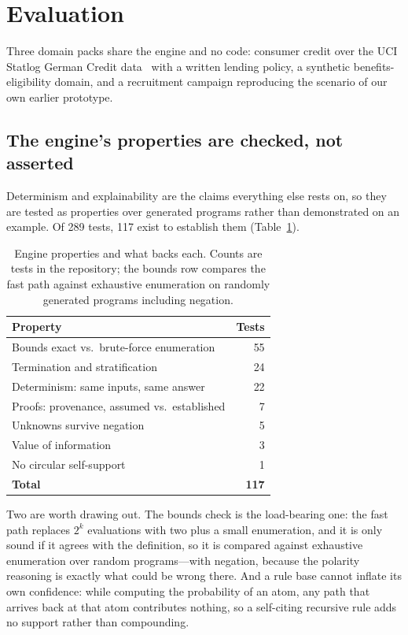 \documentclass[sigconf,nonacm]{acmart}
\begin{document}
\section{Evaluation}

Three domain packs share the engine and no code: consumer credit over the UCI
Statlog German Credit data~\cite{hofmann1994} with a written lending policy, a
synthetic benefits-eligibility domain, and a recruitment campaign reproducing
the scenario of our own earlier prototype.

\subsection{The engine's properties are checked, not asserted}

Determinism and explainability are the claims everything else rests on, so they
are tested as properties over generated programs rather than demonstrated on an
example. Of 289 tests, 117 exist to establish them (Table~\ref{tab:engine}).

\begin{table}[t]
  \caption{Engine properties and what backs each. Counts are tests in the
  repository; the bounds row compares the fast path against exhaustive
  enumeration on randomly generated programs including negation.}
  \label{tab:engine}
  \begin{tabular}{lr}
    \toprule
    \textbf{Property} & \textbf{Tests} \\
    \midrule
    Bounds exact vs.\ brute-force enumeration & 55 \\
    Termination and stratification            & 24 \\
    Determinism: same inputs, same answer     & 22 \\
    Proofs: provenance, assumed vs.\ established & 7 \\
    Unknowns survive negation                 & 5 \\
    Value of information                      & 3 \\
    No circular self-support                  & 1 \\
    \midrule
    \textbf{Total}                            & \textbf{117} \\
    \bottomrule
  \end{tabular}
\end{table}

Two are worth drawing out. The bounds check is the load-bearing one: the fast
path replaces $2^{k}$ evaluations with two plus a small enumeration, and it is
only sound if it agrees with the definition, so it is compared against
exhaustive enumeration over random programs---with negation, because the
polarity reasoning is exactly what could be wrong there. And a rule base cannot
inflate its own confidence: while computing the probability of an atom, any path
that arrives back at that atom contributes nothing, so a self-citing recursive
rule adds no support rather than compounding.
\end{document}
